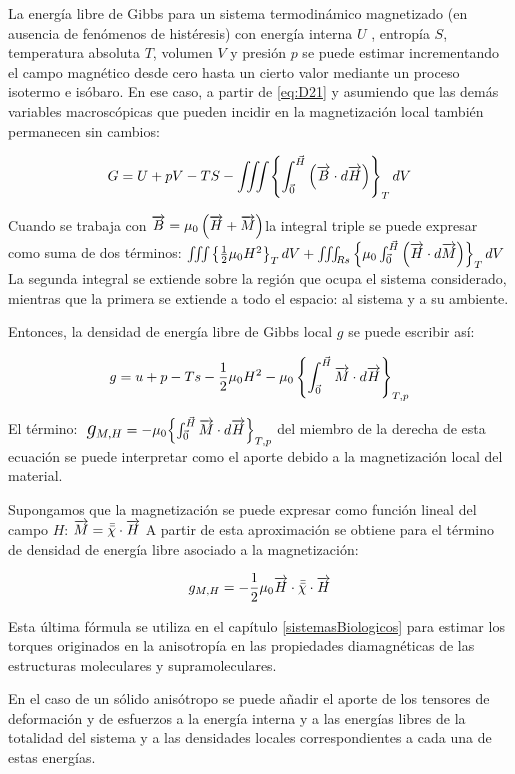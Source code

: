 La energía libre de Gibbs para un sistema termodinámico magnetizado (en ausencia de fenómenos de histéresis) con energía interna $U$ , entropía $S$, temperatura absoluta $T$, volumen $V$ y presión $p$ se puede estimar incrementando el campo magnético desde cero hasta un cierto valor mediante un proceso isotermo e isóbaro. En ese caso, a partir de \ref{eq:D21} y asumiendo que las demás variables macroscópicas que pueden incidir en la magnetización local también permanecen sin cambios:


\begin{equation}
	\label{eq:D22}
	 G = U + pV - TS - \iiint\left\lbrace \int_{\vec{0}}^{\vec{H}} \left( \overrightarrow{B}\cdot d\overrightarrow{H} \right) \right\rbrace_{T} dV
\end{equation}

\begin{sloppypar}
Cuando se trabaja con ${\overrightarrow{B} = \mu_{0}\left( \overrightarrow{H}+\overrightarrow{M} \right)}$la integral triple se puede expresar como suma de dos términos: ${\iiint\left\lbrace \frac{1}{2}\mu_{0}H^{2} \right\rbrace_{T} dV +
\iiint_{Rs}\left\lbrace \mu_{0} \int_{\vec{0}}^{\vec{H}} \left( \overrightarrow{H}\cdot d\overrightarrow{M} \right)  \right\rbrace_{T} dV}$ La segunda integral se extiende sobre la región que ocupa el sistema considerado, mientras que la primera se extiende a todo el espacio: al sistema y a su ambiente.
\end{sloppypar}

Entonces, la densidad de energía libre de Gibbs local $g$ se puede escribir así:

\begin{equation}
	\label{eq:D23}
	 g = u + p - Ts -\frac{1}{2}\mu_{0}H^{2} - \mu_{0} \left\lbrace \int_{\vec{0}}^{\vec{H}} \overrightarrow{M}\cdot d\overrightarrow{H}\right\rbrace_{T,p}
\end{equation}

El término: $\;\Bb{g}_{M, H}=-\mu_{0}{\left\lbrace \int_{\vec{0}}^{\vec{H}} \V{M}\cdot d\V{H}\right\rbrace}_{T,p}$ del miembro de la derecha de esta ecuación se puede interpretar como el aporte debido a la magnetización local del material.

Supongamos que la magnetización se puede expresar como función lineal del campo $H$: $\overrightarrow{M}= \bar{\bar{\chi}} \cdot \overrightarrow{H}$ A partir de esta aproximación se obtiene para el término de densidad de energía libre asociado a la magnetización: 

\begin{equation}
	\label{eq:D24}
	 g_{M,H} = -\frac{1}{2}\mu_{0}\overrightarrow{H}\cdot \bar{\bar{\chi}} \cdot \overrightarrow{H}
\end{equation}

Esta última fórmula se utiliza en el capítulo \ref{sistemasBiologicos} para estimar los torques originados en la anisotropía en las propiedades diamagnéticas de las estructuras moleculares y supramoleculares.

En el caso de un sólido anisótropo se puede añadir el aporte de los tensores de deformación y de esfuerzos a la energía interna y a las energías libres de la totalidad del sistema y a las densidades locales correspondientes a cada una de estas energías.
